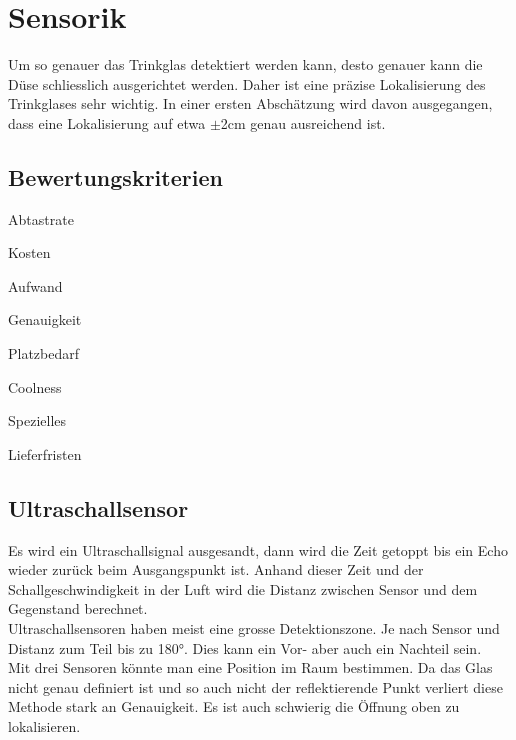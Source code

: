 \section{Sensorik}
Um so genauer das Trinkglas detektiert werden kann, desto genauer kann die Düse schliesslich ausgerichtet werden. Daher ist eine präzise Lokalisierung des Trinkglases sehr wichtig. In einer ersten Abschätzung wird davon ausgegangen, dass eine Lokalisierung auf etwa $\pm$2cm genau ausreichend ist.\\

	\subsection{Bewertungskriterien}
		\begin{description}
			\item Abtastrate
			\item Kosten
			\item Aufwand
			\item Genauigkeit
			\item Platzbedarf
			\item Coolness
			\item Spezielles
			\item Lieferfristen
			
		\end{description}
	
	
	\subsection{Ultraschallsensor}
	Es wird ein Ultraschallsignal ausgesandt, dann wird die Zeit getoppt bis ein Echo wieder zurück beim Ausgangspunkt ist. Anhand dieser Zeit und der Schallgeschwindigkeit in der Luft wird die Distanz zwischen Sensor und dem Gegenstand berechnet.  \\
	Ultraschallsensoren haben meist eine grosse Detektionszone. Je nach Sensor und Distanz zum Teil bis zu 180°. Dies kann ein Vor- aber auch ein Nachteil sein. \\
	Mit drei Sensoren könnte man eine Position im Raum bestimmen. Da das Glas nicht genau definiert ist und so auch nicht der reflektierende Punkt verliert diese Methode stark an Genauigkeit. Es ist auch schwierig die Öffnung oben zu lokalisieren.
	
